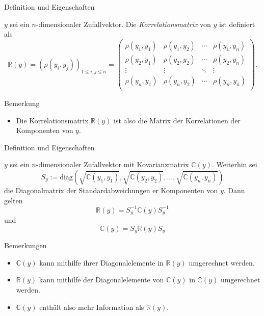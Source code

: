 \documentclass[
  8pt,
  ignorenonframetext,
]{beamer}
\providecommand{\tightlist}{%
  \setlength{\itemsep}{0pt}\setlength{\parskip}{0pt}}
\begin{document}
\begin{frame}{Definition und Eigenschaften}
\protect\hypertarget{definition-und-eigenschaften}{}
\footnotesize
\begin{definition}
\justifying
\normalfont
$y$ sei ein $n$-dimensionaler Zufallvektor. Die \textit{Korrelationsmatrix} von
$y$ ist definiert als
\begin{equation}
\mathbb{R}(y)
= \left(\rho(y_i,y_j)\right)_{1 \le i,j \le n}
=
\begin{pmatrix}
\rho(y_1,y_1) & \rho(y_1,y_2) & \cdots & \rho(y_1,y_n) \\
\rho(y_2,y_1) & \rho(y_2,y_2) & \cdots & \rho(y_2,y_n) \\
\vdots        & \vdots        & \ddots & \vdots        \\
\rho(y_n,y_1) & \rho(y_n,y_2) & \cdots & \rho(y_n,y_n) \\
\end{pmatrix}.
\end{equation}
\end{definition}

Bemerkung

\begin{itemize}
\tightlist
\item
  Die Korrelationsmatrix \(\mathbb{R}(y)\) ist also die Matrix der
  Korrelationen der Komponenten von \(y\).
\end{itemize}
\end{frame}

\begin{frame}{Definition und Eigenschaften}
\protect\hypertarget{definition-und-eigenschaften-1}{}
\footnotesize
\begin{theorem}
\justifying
\normalfont
$y$ sei ein $n$-dimensionaler Zufallvektor mit Kovarianzmatrix $\mathbb{C}(y)$.
Weiterhin sei
\begin{equation}
S_y := \mbox{diag}\left(\sqrt{\mathbb{C}(y_1,y_1)}, \sqrt{\mathbb{C}(y_2,y_2)}, ...,\sqrt{\mathbb{C}(y_n,y_n)}\right)
\end{equation}
die Diagonalmatrix der Standardabweichungen er Komponenten von $y$. Dann gelten
\begin{equation}
\mathbb{R}(y)
= S_y^{-1}\mathbb{C}(y)S_y^{-1}
\end{equation}
und
\begin{equation}
\mathbb{C}(y)
= S_y\mathbb{R}(y)S_y
\end{equation}
\end{theorem}

Bemerkungen

\begin{itemize}
\tightlist
\item
  \(\mathbb{C}(y)\) kann mithilfe ihrer Diagonalelemente in
  \(\mathbb{R}(y)\) umgerechnet werden.
\item
  \(\mathbb{R}(y)\) kann mithilfe der Diagonalelemente von
  \(\mathbb{C}(y)\) in \(\mathbb{C}(y)\) umgerechnet werden.
\item
  \(\mathbb{C}(y)\) enthält also mehr Information als \(\mathbb{R}(y)\).
\end{itemize}
\end{frame}
\end{document}
